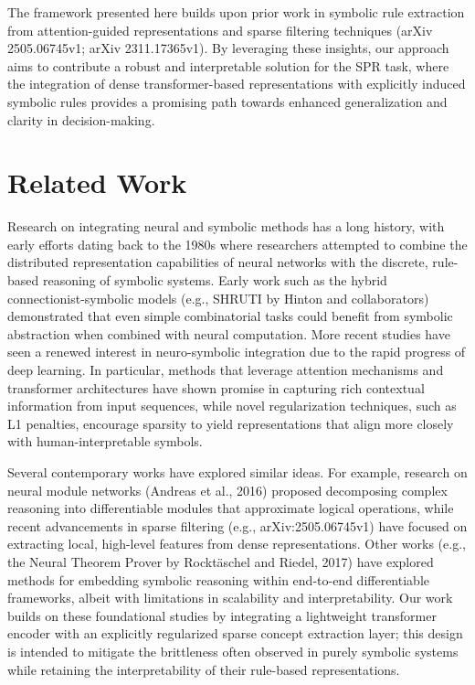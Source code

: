 \documentclass{article}
\begin{document}
The framework presented here builds upon prior work in symbolic rule extraction from attention-guided representations and sparse filtering techniques (arXiv 2505.06745v1; arXiv 2311.17365v1). By leveraging these insights, our approach aims to contribute a robust and interpretable solution for the SPR task, where the integration of dense transformer-based representations with explicitly induced symbolic rules provides a promising path towards enhanced generalization and clarity in decision-making.

\section{Related Work}
Research on integrating neural and symbolic methods has a long history, with early efforts dating back to the 1980s where researchers attempted to combine the distributed representation capabilities of neural networks with the discrete, rule-based reasoning of symbolic systems. Early work such as the hybrid connectionist-symbolic models (e.g., SHRUTI by Hinton and collaborators) demonstrated that even simple combinatorial tasks could benefit from symbolic abstraction when combined with neural computation. More recent studies have seen a renewed interest in neuro-symbolic integration due to the rapid progress of deep learning. In particular, methods that leverage attention mechanisms and transformer architectures have shown promise in capturing rich contextual information from input sequences, while novel regularization techniques, such as L1 penalties, encourage sparsity to yield representations that align more closely with human-interpretable symbols.

Several contemporary works have explored similar ideas. For example, research on neural module networks (Andreas et al., 2016) proposed decomposing complex reasoning into differentiable modules that approximate logical operations, while recent advancements in sparse filtering (e.g., arXiv:2505.06745v1) have focused on extracting local, high-level features from dense representations. Other works (e.g., the Neural Theorem Prover by Rockt{\"a}schel and Riedel, 2017) have explored methods for embedding symbolic reasoning within end-to-end differentiable frameworks, albeit with limitations in scalability and interpretability. Our work builds on these foundational studies by integrating a lightweight transformer encoder with an explicitly regularized sparse concept extraction layer; this design is intended to mitigate the brittleness often observed in purely symbolic systems while retaining the interpretability of their rule-based representations.
\end{document}
